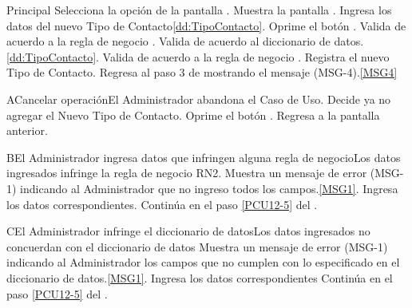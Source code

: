 	\begin{UCtrayectoria}{Principal}
			\UCpaso[\UCactor] Selecciona la opción  de la pantalla .
			\UCpaso Muestra la pantalla .
			\UCpaso [\UCactor] Ingresa los datos del nuevo Tipo de Contacto\ref{dd:TipoContacto}.
			\UCpaso [\UCactor] Oprime el botón .\label{PCU12-5}
                        \UCpaso Valida de acuerdo a la regla de negocio .  
                        \UCpaso Valida de acuerdo al diccionario de datos. \ref{dd:TipoContacto}.
                        \UCpaso Valida de acuerdo a la regla de negocio . 
			\UCpaso Registra el nuevo Tipo de Contacto.
			\UCpaso Regresa al paso 3 de mostrando el mensaje (MSG-4).\ref{MSG4}
	\end{UCtrayectoria}

	\begin{UCtrayectoriaA}{A}{Cancelar operación}{El Administrador abandona el Caso de Uso.}
			\UCpaso[\UCactor] Decide ya no agregar el Nuevo Tipo de Contacto.
			\UCpaso[\UCactor] Oprime el botón .
			\UCpaso Regresa a la pantalla anterior.
	\end{UCtrayectoriaA}

        \begin{UCtrayectoriaA}{B}{El Administrador ingresa datos que infringen alguna regla de negocio}{Los datos ingresados infringe la regla de negocio RN2.}
                        \UCpaso Muestra un mensaje de error (MSG-1) indicando al Administrador que no ingreso todos los campos.\ref{MSG1}.
			\UCpaso[\UCactor] Ingresa los datos correspondientes.
			\UCpaso Continúa en el paso \ref{PCU12-5} del .
	\end{UCtrayectoriaA}
		
        \begin{UCtrayectoriaA}{C}{El Administrador infringe el diccionario de datos}{Los datos ingresados no concuerdan con el diccionario de datos}
                        \UCpaso Muestra un mensaje de error (MSG-1) indicando al Administrador los campos que no cumplen con lo especificado en el diccionario de datos.\ref{MSG1}.
			\UCpaso[\UCactor] Ingresa los datos correspondientes
			\UCpaso Continúa en el paso \ref{PCU12-5} del .
	\end{UCtrayectoriaA}

